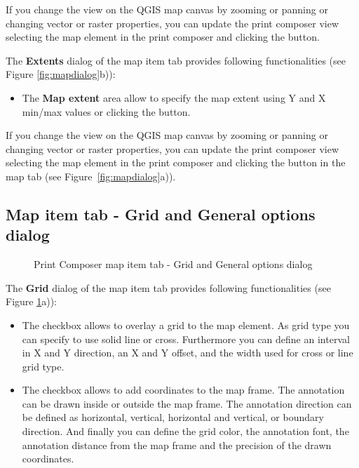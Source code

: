 If you change the view on the QGIS map canvas by zooming or panning or
changing vector or raster properties, you can update the print composer view
selecting the map element in the print composer and clicking the
 button.


The \textbf{Extents} dialog of the map item tab provides following functionalities
(see Figure \ref{fig:mapdialog}b)):

\begin{itemize}[label=--]
\item The \textbf{Map extent} area allow to specify the map extent using Y
and X min/max values or clicking the  button.
\end{itemize}

If you change the view on the QGIS map canvas by zooming or panning or
changing vector or raster properties, you can update the print composer view
selecting the map element in the print composer and clicking the
 button in the map  tab (see
Figure~\ref{fig:mapdialog}a)).

\subsection{Map item tab - Grid and General options dialog}

\begin{figure}[ht]
\centering
   \hspace{1cm}
   \caption{Print Composer map item tab - Grid and General options dialog \nixcaption}\label{fig:sec_map_dialog}
\end{figure}


The \textbf{Grid} dialog of the map item tab provides following functionalities
(see Figure \ref{fig:sec_map_dialog}a)):

\begin{itemize}[label=--]
\item The  checkbox allows to overlay a grid to the map
element. As grid type you can specify to use solid line or cross. Furthermore
you can define an interval in X and Y direction, an X and Y offset, and the
width used for cross or line grid type.
\item The  checkbox allows to add coordinates to
the map frame. The annotation can be drawn inside or outside the map frame.
The annotation direction can be defined as horizontal, vertical, horizontal and
vertical, or boundary direction. And finally you can define the grid color,
the annotation font, the annotation distance from the map frame and the
precision of the drawn coordinates.
\end{itemize}

